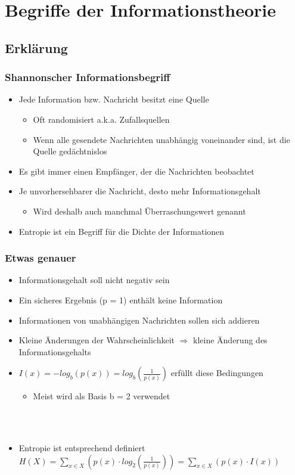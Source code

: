 \section{Begriffe der Informationstheorie}
\subsection{Erklärung}
\begin{frame}
	\frametitle{Shannonscher Informationsbegriff}
	\begin{itemize}
		\item Jede Information bzw. Nachricht besitzt eine Quelle
		\begin{itemize}
			\item Oft randomisiert a.k.a. Zufallsquellen
			\item Wenn alle gesendete Nachrichten unabhängig voneinander sind, ist die Quelle gedächtnislos
		\end{itemize}
		\item Es gibt immer einen Empfänger, der die Nachrichten beobachtet
		\item Je unvorhersehbarer die Nachricht, desto mehr Informationsgehalt
		\begin{itemize}
				\item Wird deshalb auch manchmal Überraschungswert genannt
		\end{itemize}
		\item Entropie ist ein Begriff für die Dichte der Informationen
	\end{itemize}
\end{frame}

\begin{frame}
	\frametitle{Etwas genauer}
	\begin{itemize}
		\item Informationsgehalt soll nicht negativ sein
		\item Ein sicheres Ergebnis (p = 1) enthält keine Information
		\item Informationen von unabhängigen Nachrichten sollen sich addieren
		\item Kleine Änderungen der Wahrscheinlichkeit $\Rightarrow$ kleine Änderung des Informationsgehalts
		\item $I(x) = -log_b(p(x)) = log_b(\frac{1}{p(x)})$ erfüllt diese Bedingungen
		\begin{itemize}
			\item Meist wird als Basis b = 2 verwendet
		\end{itemize}~\\~\\
		\item Entropie ist entsprechend definiert~\\ $H(X) = \sum\limits_{x \in X} (p(x) \cdot log_2(\frac{1}{p(x)})) = \sum\limits_{x \in X} (p(x) \cdot I(x))$
	\end{itemize}
\end{frame}


